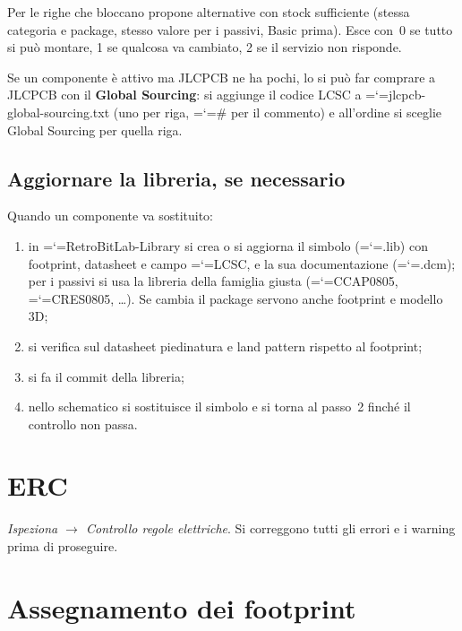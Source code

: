 \documentclass[11pt,a4paper]{article}
\makeatletter
\newcommand{\file}[1]{{\ttfamily\hyphenchar\font=`\-\relax\language=\l@nohyphenation #1}}
\makeatother
\begin{document}
Per le righe che bloccano propone alternative con stock sufficiente (stessa
categoria e package, stesso valore per i passivi, Basic prima). Esce con~0 se
tutto si può montare, 1 se qualcosa va cambiato, 2 se il servizio non risponde.

Se un componente è attivo ma JLCPCB ne ha pochi, lo si può far comprare a
JLCPCB con il \textbf{Global Sourcing}: si aggiunge il codice LCSC a
\file{jlcpcb-global-sourcing.txt} (uno per riga, \file{\#} per il commento) e
all'ordine si sceglie Global Sourcing per quella riga.

\subsection*{Aggiornare la libreria, se necessario}

Quando un componente va sostituito:

\begin{enumerate}[leftmargin=*]
  \item in \file{RetroBitLab-Library} si crea o si aggiorna il simbolo
        (\file{.lib}) con footprint, datasheet e campo \file{LCSC}, e la sua
        documentazione (\file{.dcm}); per i passivi si usa la libreria della
        famiglia giusta (\file{CCAP0805}, \file{CRES0805}, \dots). Se cambia il
        package servono anche footprint e modello 3D;
  \item si verifica sul datasheet piedinatura e land pattern rispetto al
        footprint;
  \item si fa il commit della libreria;
  \item nello schematico si sostituisce il simbolo e si torna al passo~2
        finché il controllo non passa.
\end{enumerate}

\section{ERC}

\emph{Ispeziona $\rightarrow$ Controllo regole elettriche}. Si correggono tutti
gli errori e i warning prima di proseguire.

\section{Assegnamento dei footprint}
\end{document}
